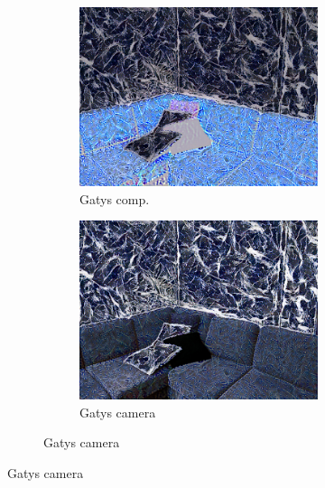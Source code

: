 \begin{figure}[]
\begin{subfigure}{\textwidth}
\begin{subfigure}{0.24\textwidth}
        \end{subfigure}
        \hfill
        \begin{subfigure}{0.24\textwidth}
            \centering
            \includegraphics[width=\textwidth]{images/04-experiment02/sofa/marble/gatys_im.jpg}
            \caption*{Gatys comp.}
        \end{subfigure}
        \hfill
        \begin{subfigure}{0.24\textwidth}
            \centering
            \includegraphics[width=\textwidth]{images/04-experiment02/sofa/marble/gatys_proj.jpg}
            \caption*{Gatys camera}
        \end{subfigure}
        

\end{subfigure}
\end{figure}
